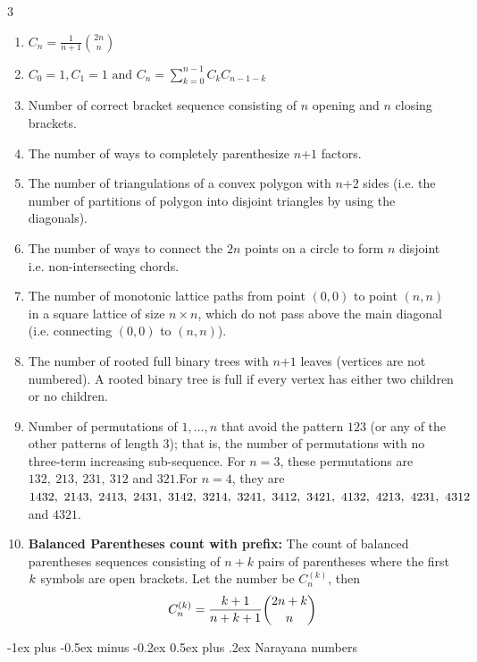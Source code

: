 \documentclass[8pt,a4paper,onesided]{article}
\makeatletter
\renewcommand{\subsection}{\@startsection{subsection}{2}{0mm}
    {-1ex plus -0.5ex minus -0.2ex} %
    {0.5ex plus .2ex}                %
    {\normalfont\large\bfseries}}    %
\makeatother
\begin{document}
\begin{multicols}{3}
\begin{enumerate}[resume]
    \item $\displaystyle C_n=\frac{1}{n+1}{2n \choose n}$
    \item $\displaystyle C_0=1,C_1=1\text{ and }C_n=\sum \limits_{k=0}^{n-1}C_k C_{n-1-k}$
    \item Number of correct bracket sequence consisting of $n$ opening and $n$ closing brackets.
    \item The number of ways to completely parenthesize $n$+$\displaystyle 1$ factors.
    \item The number of triangulations of a convex polygon with $n$+$\displaystyle 2$ sides (i.e. the number of partitions of polygon into disjoint triangles by using the diagonals).
    \item The number of ways to connect the $\displaystyle 2n$ points on a circle to form $n$ disjoint i.e. non-intersecting chords.
    \item The number of monotonic lattice paths from point $\displaystyle (0,0)$ to point $\displaystyle (n,n)$ in a square lattice of size $n\times n$, which do not pass above the main diagonal (i.e. connecting $\displaystyle (0,0)$ to $\displaystyle (n,n)$).
    \item The number of rooted full binary trees with $n$+$\displaystyle 1$ leaves (vertices are not numbered). A rooted binary tree is full if every vertex has either two children or no children.
    \item Number of permutations of $\displaystyle {1, \dots, n}$ that avoid the pattern $\displaystyle 123$ (or any of the other patterns of length $3$); that is, the number of permutations with no three-term increasing sub-sequence. For $n = 3$, these permutations are $\displaystyle 132,\ 213,\ 231,\ 312$ and $321.$\displaystyle For $n = 4$, they are $\displaystyle 1432,\ 2143,\ 2413,\ 2431,\ 3142,\ 3214,\\ \ 3241,\ 3412,\ 3421,\ 4132,\ 4213,\ 4231,\ 4312$ and $4321.$
    \item \textbf{Balanced Parentheses count with prefix:}
    The count of balanced parentheses sequences consisting of $n+k$ pairs of parentheses where the first $\displaystyle \displaystyle k$ symbols are open brackets. Let the number be $\displaystyle C_n^{(k)}$, then
    \[\displaystyle \displaystyle C_n^{(k)} = \frac{k+1}{n+k+1} \binom{2n+k}{n}\]
\end{enumerate}

\subsection{Narayana numbers}


\end{multicols}
\end{document}
